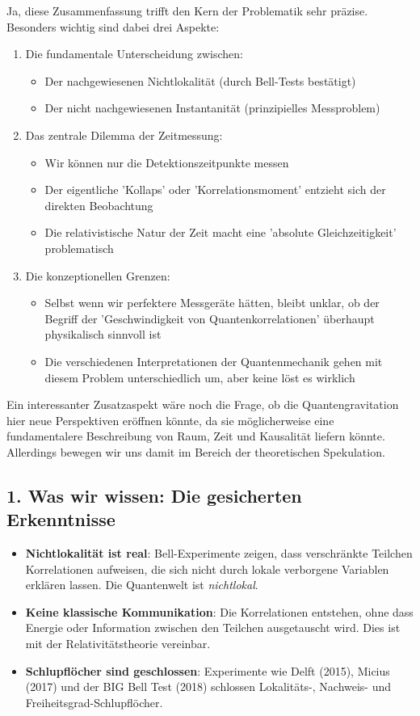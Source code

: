 \documentclass[12pt,a4paper]{article}
\begin{document}
Ja, diese Zusammenfassung trifft den Kern der Problematik sehr präzise. Besonders wichtig sind dabei drei Aspekte:

\begin{enumerate}
    \item Die fundamentale Unterscheidung zwischen:
    \begin{itemize}
        \item Der nachgewiesenen Nichtlokalität (durch Bell-Tests bestätigt)
        \item Der nicht nachgewiesenen Instantanität (prinzipielles Messproblem)
    \end{itemize}
    \item Das zentrale Dilemma der Zeitmessung:
    \begin{itemize}
        \item Wir können nur die Detektionszeitpunkte messen
        \item Der eigentliche 'Kollaps' oder 'Korrelationsmoment' entzieht sich der direkten Beobachtung
        \item Die relativistische Natur der Zeit macht eine 'absolute Gleichzeitigkeit' problematisch
    \end{itemize}
    \item Die konzeptionellen Grenzen:
    \begin{itemize}
        \item Selbst wenn wir perfektere Messgeräte hätten, bleibt unklar, ob der Begriff der 'Geschwindigkeit von Quantenkorrelationen' überhaupt physikalisch sinnvoll ist
        \item Die verschiedenen Interpretationen der Quantenmechanik gehen mit diesem Problem unterschiedlich um, aber keine löst es wirklich
    \end{itemize}
\end{enumerate}

Ein interessanter Zusatzaspekt wäre noch die Frage, ob die Quantengravitation hier neue Perspektiven eröffnen könnte, da sie möglicherweise eine fundamentalere Beschreibung von Raum, Zeit und Kausalität liefern könnte. Allerdings bewegen wir uns damit im Bereich der theoretischen Spekulation.

\subsection{1. Was wir wissen: Die gesicherten Erkenntnisse}
\begin{itemize}
    \item \textbf{Nichtlokalität ist real}: Bell-Experimente zeigen, dass verschränkte Teilchen Korrelationen aufweisen, die sich nicht durch lokale verborgene Variablen erklären lassen. Die Quantenwelt ist \textit{nichtlokal}.
    \item \textbf{Keine klassische Kommunikation}: Die Korrelationen entstehen, ohne dass Energie oder Information zwischen den Teilchen ausgetauscht wird. Dies ist mit der Relativitätstheorie vereinbar.
    \item \textbf{Schlupflöcher sind geschlossen}: Experimente wie Delft (2015), Micius (2017) und der BIG Bell Test (2018) schlossen Lokalitäts-, Nachweis- und Freiheitsgrad-Schlupflöcher.
\end{itemize}
\end{document}
